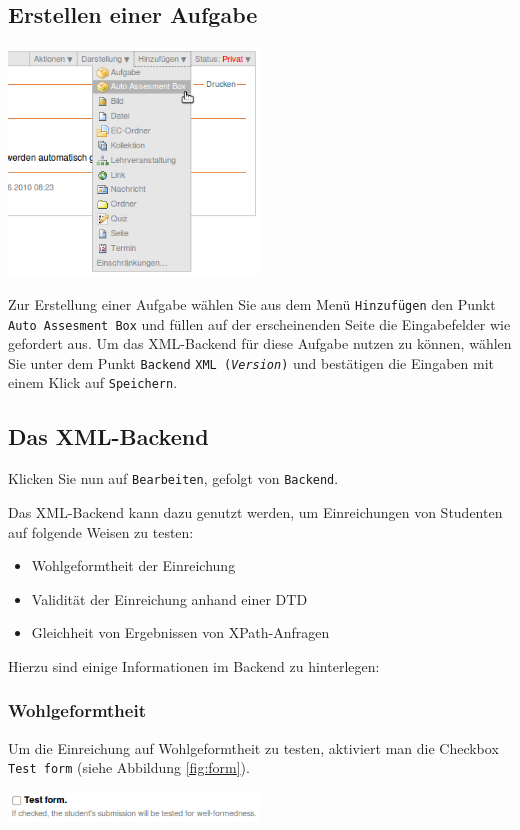 \documentclass[a4paper]{scrartcl}
\newcommand{\anf}[1]{\glqq{}#1\grqq{}}
\begin{document}
	  \subsection{Erstellen einer Aufgabe}
	  \begin{center}
	    \includegraphics[width=0.50\textwidth]{images/AddingECAAB.png}
	    \label{fig:ecaab}
    \end{center}
	  Zur Erstellung einer Aufgabe wählen Sie aus dem Menü \anf{\texttt{Hinzufügen}} den Punkt \anf{\texttt{Auto Assesment Box}} und füllen auf der erscheinenden Seite die Eingabefelder wie gefordert aus.
	  Um das XML-Backend für diese Aufgabe nutzen zu können, wählen Sie unter dem Punkt \anf{\texttt{Backend}} \anf{\texttt{XML (\textit{Version})}} und bestätigen die Eingaben mit einem Klick auf \anf{\texttt{Speichern}}.
	  \subsection{Das XML-Backend}
	  Klicken Sie nun auf \anf{\texttt{Bearbeiten}}, gefolgt von \anf{\texttt{Backend}}.
	  
	  Das XML-Backend kann dazu genutzt werden, um Einreichungen von Studenten auf folgende Weisen zu testen:
	  \begin{itemize}
	    \item Wohlgeformtheit der Einreichung
	    \item Validität der Einreichung anhand einer DTD
	    \item Gleichheit von Ergebnissen von XPath-Anfragen
	  \end{itemize}
	  Hierzu sind einige Informationen im Backend zu hinterlegen:
  	  \subsubsection{Wohlgeformtheit}
  	  Um die Einreichung auf Wohlgeformtheit zu testen, aktiviert man die Checkbox \anf{\texttt{Test form}} (siehe Abbildung \ref{fig:form}).
  	  \begin{center}
	      \includegraphics[width=0.50\textwidth]{images/Form.png}
	      \label{fig:form}
      \end{center}
      
\end{document}
